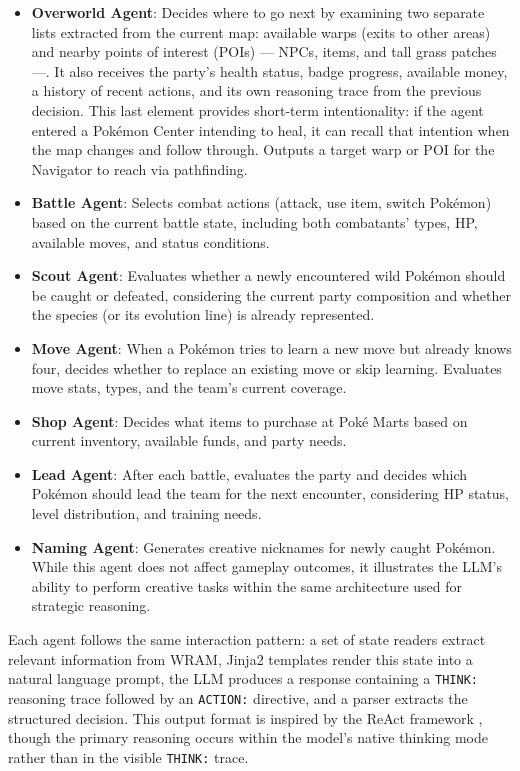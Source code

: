 \documentclass{article}
\begin{document}
\begin{itemize}
  \item \textbf{Overworld Agent}: Decides where to go next by examining two separate lists extracted from the current map: available warps (exits to other areas) and nearby points of interest (POIs) --- NPCs, items, and tall grass patches ---. It also receives the party's health status, badge progress, available money, a history of recent actions, and its own reasoning trace from the previous decision. This last element provides short-term intentionality: if the agent entered a Pok\'{e}mon Center intending to heal, it can recall that intention when the map changes and follow through. Outputs a target warp or POI for the Navigator to reach via pathfinding.
  \item \textbf{Battle Agent}: Selects combat actions (attack, use item, switch Pok\'{e}mon) based on the current battle state, including both combatants' types, HP, available moves, and status conditions.
  \item \textbf{Scout Agent}: Evaluates whether a newly encountered wild Pok\'{e}mon should be caught or defeated, considering the current party composition and whether the species (or its evolution line) is already represented.
  \item \textbf{Move Agent}: When a Pok\'{e}mon tries to learn a new move but already knows four, decides whether to replace an existing move or skip learning. Evaluates move stats, types, and the team's current coverage.
  \item \textbf{Shop Agent}: Decides what items to purchase at Pok\'{e} Marts based on current inventory, available funds, and party needs.
  \item \textbf{Lead Agent}: After each battle, evaluates the party and decides which Pok\'{e}mon should lead the team for the next encounter, considering HP status, level distribution, and training needs.
  \item \textbf{Naming Agent}: Generates creative nicknames for newly caught Pok\'{e}mon. While this agent does not affect gameplay outcomes, it illustrates the LLM's ability to perform creative tasks within the same architecture used for strategic reasoning.
\end{itemize}

Each agent follows the same interaction pattern: a set of state readers extract relevant information from WRAM, Jinja2 templates render this state into a natural language prompt, the LLM produces a response containing a \texttt{THINK:} reasoning trace followed by an \texttt{ACTION:} directive, and a parser extracts the structured decision. This output format is inspired by the ReAct framework \citep{yao2023react}, though the primary reasoning occurs within the model's native thinking mode rather than in the visible \texttt{THINK:} trace.
\end{document}
